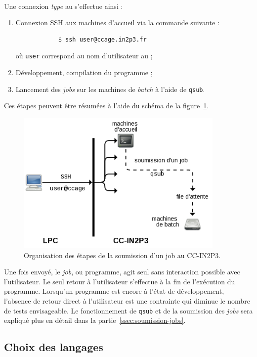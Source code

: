 \

Une connexion \emph{type} au \CC{} s'effectue ainsi :
	\begin{enumerate}
		\item Connexion SSH aux machines d'accueil via la commande suivante :
		\begin{verbatim}
			$ ssh user@ccage.in2p3.fr
		\end{verbatim}%
		où \texttt{user} correspond au nom d'utilisateur au \CC{} ;
		\item Développement, compilation du programme ;
		\item Lancement des \emph{jobs} sur les machines de \emph{batch} à l'aide de \texttt{qsub}.
	\end{enumerate}
Ces étapes peuvent être résumées à l'aide du schéma de la figure~\ref{fig:cc-querry}.
	\begin{figure}
		\centering
		\includegraphics[width=0.9\textwidth]{img/cc-querry.png}
		\caption[Organisation d'une soumission de job au CC-IN2P3]{Organisation des étapes de la soumission d'un job au CC-IN2P3.}
		\label{fig:cc-querry}
	\end{figure}
Une fois envoyé, le \emph{job}, ou programme, agit seul sans interaction possible avec l'utilisateur. Le seul retour à l'utilisateur s'effectue à la fin de l'exécution du programme. Lorsqu'un programme est encore à l'état de développement, l'absence de retour direct à l'utilisateur est une contrainte qui diminue le nombre de tests envisageable. Le fonctionnement de \texttt{qsub} et de la soumission des \emph{jobs} sera expliqué plus en détail dans la partie~\ref{ssec:soumission-jobs}.

	\subsection{Choix des langages}

